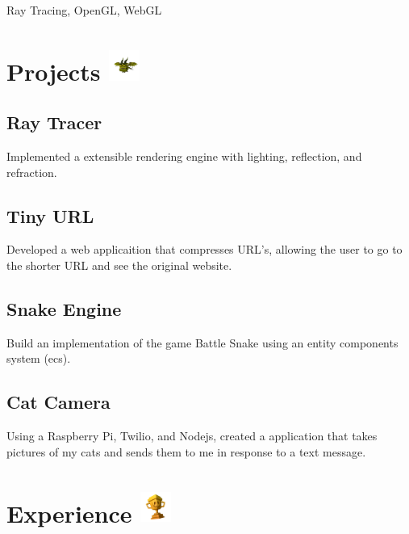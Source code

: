 \documentclass{article}
\newcommand{\hrefColored}[3]{\href{#2}{\color{#1}{#3}}}
\begin{document}
Ray Tracing, OpenGL, WebGL

\section{Projects \protect\includegraphics[height=1cm]{Frank.png}}

\subsection{Ray Tracer \hrefColored{blue}{https://github.com/McRaeAlex/tiny-raytracer}{github.com/McRaeAlex/tiny-raytracer}}

Implemented a extensible rendering engine with lighting, reflection, and 
refraction.

\subsection{Tiny URL \hrefColored{blue}{https://github.com/McRaeAlex/tinyURL}{github.com/McRaeAlex/tinyURL}}

Developed a web applicaition that compresses URL's, allowing the user to go to 
the shorter URL and see the original website.

\subsection{Snake Engine \hrefColored{blue}{https://github.com/McRaeAlex/dimensional-snake-engine}{github.com/McRaeAlex/dimensional-snake-engine}}

Build an implementation of the game Battle Snake using an entity components
system (ecs).

\subsection{Cat Camera \hrefColored{blue}{https://github.com/McRaeAlex/prettykitty}{github.com/McRaeAlex/prettykitty}}

Using a Raspberry Pi, Twilio, and Nodejs, created a application that takes 
pictures of my cats and sends them to me in response to a text message.

\section{Experience \protect\includegraphics[height=1cm]{trophy.png}}
\end{document}
